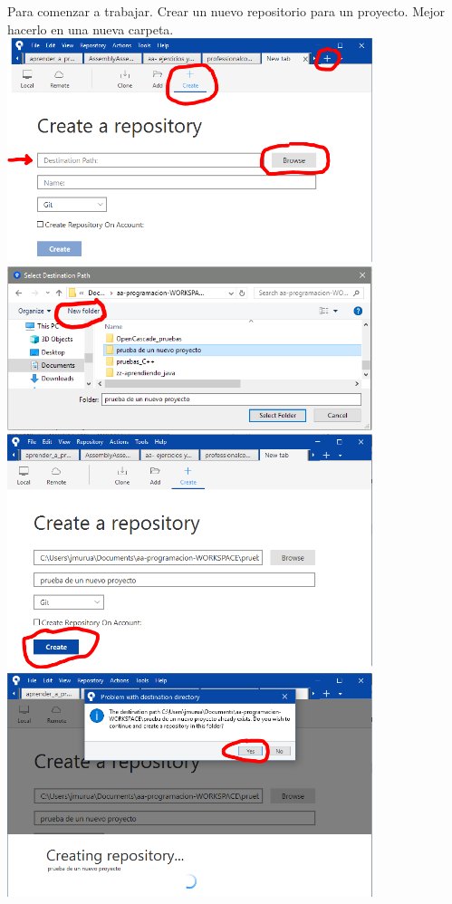 \documentclass[spanish,12pt,a4paper,final,oneside]{book}
\begin{document}
Para comenzar a trabajar. Crear un nuevo repositorio para un proyecto. Mejor hacerlo en una nueva carpeta.
\\ \includegraphics[width=0.8\textwidth]{Sourcetree - dar la orden de crear nuevo repositorio}
\\ \includegraphics[width=0.8\textwidth]{Sourcetree - crear nueva carpeta en el disco}
\\ \includegraphics[width=0.8\textwidth]{Sourcetree - crear nuevo repositorio}
\\ \includegraphics[width=0.8\textwidth]{Sourcetree - aviso al crear nuevo repositorio}
\end{document}
